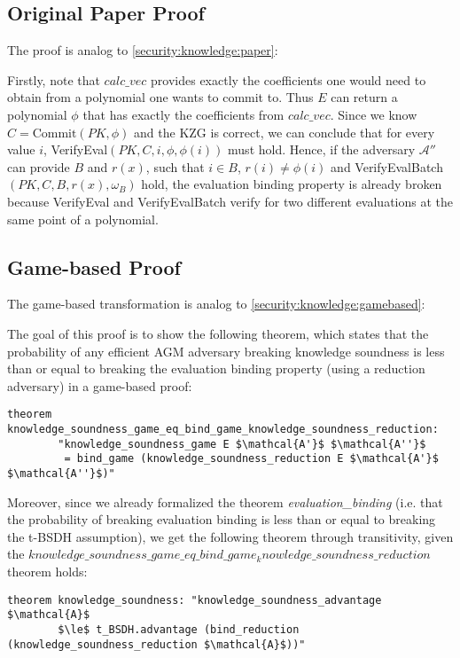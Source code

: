 \subsection{Original Paper Proof}
\label{batch:security:knowledge:paper}
The proof is analog to \ref{security:knowledge:paper}:

Firstly, note that $calc\_vec$ provides exactly the coefficients one would need to obtain from a polynomial one wants to commit to. Thus $E$ can return a polynomial $\phi$ that has exactly the coefficients from $calc\_vec$. Since we know $C= \text{Commit}(PK, \phi)$ and the KZG is correct, we can conclude that for every value $i$, VerifyEval$(PK, C, i, \phi, \phi(i))$ must hold. Hence, if the adversary $\mathcal{A''}$ can provide $B$ and $r(x)$, such that $i\in B$, $r(i)\ne\phi(i)$
and VerifyEvalBatch$(PK, C, B, r(x), \omega_B)$ hold, the evaluation binding property is already broken because VerifyEval and VerifyEvalBatch verify for two different evaluations at the same point of a polynomial.

\subsection{Game-based Proof}
\label{batch:security:knowledge:gamebased}

The game-based transformation is analog to \ref{security:knowledge:gamebased}:

The goal of this proof is to show the following theorem, which states that the probability of any efficient AGM adversary breaking  knowledge soundness is less than or equal to breaking the evaluation binding property (using a reduction adversary) in a game-based proof:
\begin{lstlisting}[language=isabelle]
    theorem knowledge_soundness_game_eq_bind_game_knowledge_soundness_reduction: 
        "knowledge_soundness_game E $\mathcal{A'}$ $\mathcal{A''}$ 
         = bind_game (knowledge_soundness_reduction E $\mathcal{A'}$ $\mathcal{A''}$)"
\end{lstlisting}
Moreover, since we already formalized the theorem \textit{evaluation\_binding} (i.e. that the probability of breaking evaluation binding is less than or equal to breaking the t-BSDH assumption), we get the following theorem through transitivity, given the $knowledge\_soundness\_game\_eq\_bind\_game_knowledge\_soundness\_reduction$ theorem holds: 

\begin{lstlisting}[language=isabelle]
    theorem knowledge_soundness: "knowledge_soundness_advantage $\mathcal{A}$ 
        $\le$ t_BSDH.advantage (bind_reduction (knowledge_soundness_reduction $\mathcal{A}$))"
\end{lstlisting}

